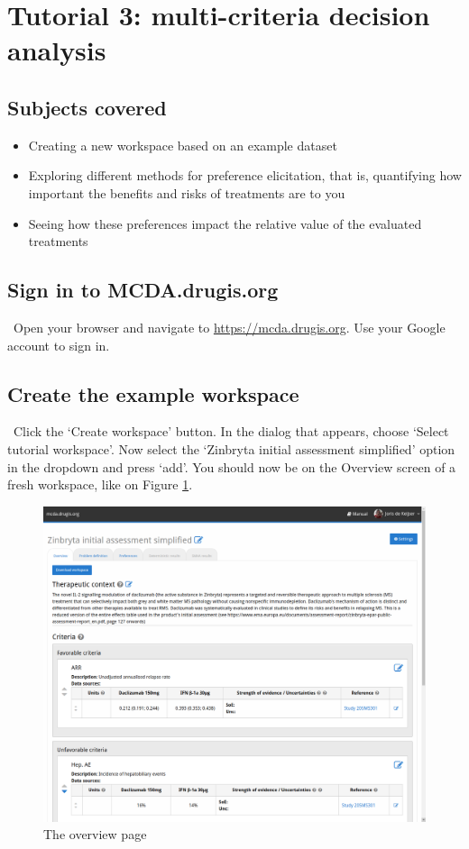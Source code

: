 \documentclass[00_mcda_tutorial.tex]{subfiles}
\begin{document}
\section*{Tutorial 3: multi-criteria decision analysis}
\addtocounter{section}{1}

\subsection*{Subjects covered}
\begin{itemize}
\item Creating a new workspace based on an example dataset
\item Exploring different methods for preference elicitation, that is, quantifying how important the benefits and risks of treatments are to you
\item Seeing how these preferences impact the relative value of the evaluated treatments
\end{itemize}

\subsection*{Sign in to MCDA.drugis.org}
\leftpointright \, Open your browser and navigate to \href{https://mcda.drugis.org}{https://mcda.drugis.org}. Use your Google account to sign in.

\subsection*{Create the example workspace}
\leftpointright \, Click the ‘Create workspace’ button. In the dialog that appears, choose ‘Select tutorial workspace’. Now select the ‘Zinbryta initial assessment simplified’ option in the dropdown and press ‘add’. You should now be on the Overview screen of a fresh workspace, like on Figure \ref{fig:overview_page}.
\newline

\begin{figure}[!h]
    \centering
	\includegraphics[width=\textwidth]{fig/overviewPage.png}
    \caption{The overview page}
	\label{fig:overview_page}
\end{figure}
\end{document}
